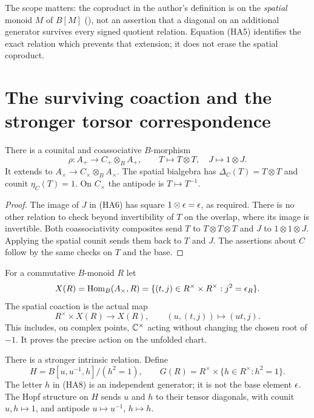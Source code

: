 The scope matters: the coproduct in the author's definition is on the
\emph{spatial} monoid $M$ of $B[M]$ (), not an
assertion that a diagonal on an additional generator survives every
signed quotient relation. Equation (HA5) identifies the exact relation
which prevents that extension; it does not erase the spatial coproduct.

\section{The surviving coaction and the stronger torsor correspondence}

\begin{proposition}
There is a counital and coassociative $B$-morphism
\begin{equation}\tag{HA6}
 \rho:A_+\longrightarrow C_+\otimes_B A_+,
 \qquad T\longmapsto T\otimes T,\quad J\longmapsto1\otimes J.
\end{equation}
It extends to $A_\times\to C_\times\otimes_B A_\times$.
The spatial bialgebra has $\Delta_C(T)=T\otimes T$ and counit
$\eta_C(T)=1$. On $C_\times$ the antipode is $T\mapsto T^{-1}$.
\end{proposition}
\begin{proof}
The image of $J$ in (HA6) has square $1\otimes\epsilon=\epsilon$, as required.
There is no other relation to check beyond invertibility of $T$ on the
overlap, where its image is invertible. Both coassociativity composites
send $T$ to $T\otimes T\otimes T$ and $J$ to $1\otimes1\otimes J$.
Applying the spatial counit sends them back to $T$ and $J$.
The assertions about $C$ follow by the same checks on $T$ and the base.
\end{proof}

For a commutative $B$-monoid $R$ let
\[
 X(R)=\operatorname{Hom}_B(A_\times,R)
     =\{(t,j)\in R^\times\times R^\times:j^2=\epsilon_R\}.
\]
The spatial coaction is the actual map
\begin{equation}\tag{HA7}
 R^\times\times X(R)\longrightarrow X(R),
 \qquad (u,(t,j))\longmapsto(ut,j).
\end{equation}
This includes, on complex points, $\mathbb C^\times$ acting without changing the
chosen root of $-1$. It proves the precise action on the unfolded chart.

There is a stronger intrinsic relation. Define
\begin{equation}\tag{HA8}
 H=B[u,u^{-1},h]/(h^2=1),\qquad
 G(R)=R^\times\times\{h\in R^\times:h^2=1\}.
\end{equation}
The letter $h$ in (HA8) is an independent generator; it is not the base
element $\epsilon$. The Hopf structure on $H$ sends $u$ and $h$ to their
tensor diagonals, with counit $u,h\mapsto1$, and antipode
$u\mapsto u^{-1}$, $h\mapsto h$.

